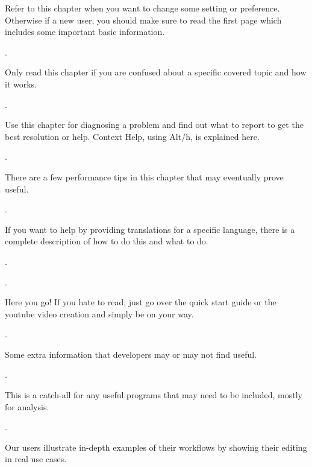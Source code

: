 \begin{description}
        Refer to this chapter when you want to change some setting or preference.
        Otherwise if a new user, you should make sure to read the first page which includes some important basic information.

    \item[Chapter~\ref{cha:how_stuff_works}] .

        Only read this chapter if you are confused about a specific covered topic and how it works.

    \item[Chapter~\ref{cha:troubleshooting_help}] .

        Use this chapter for diagnosing a problem and find out what to report to get the best resolution or help.  Context Help, using Alt/h, is explained here.

    \item[Chapter~\ref{cha:performance_tips}]  .

        There are a few performance tips in this chapter that may eventually prove useful.

    \item[Chapter~\ref{cha:translations}] .

        If you want to help by providing translations for a specific language, there is a complete description of how to do this and what to do.

    \item[Chapter~\ref{cha:licenses}] .

    \item[Appendix~\ref{cha:Quickstart}] .

        Here you go! If you hate to read, just go over the quick start guide or the youtube video creation and simply be on your way.

    \item[Appendix~\ref{cha:developer's_section}] .

        Some extra information that developers may or may not find useful.

    \item[Appendix~\ref{cha:auxiliary_programs}] .

        This is a catch-all for any useful programs that may need to be included, mostly for analysis.
        
     \item[Appendix~\ref{cha:editing_real_world_usage}] .
    
    	Our users illustrate in-depth examples of their workflows by showing their editing in real use cases.

\end{description}

